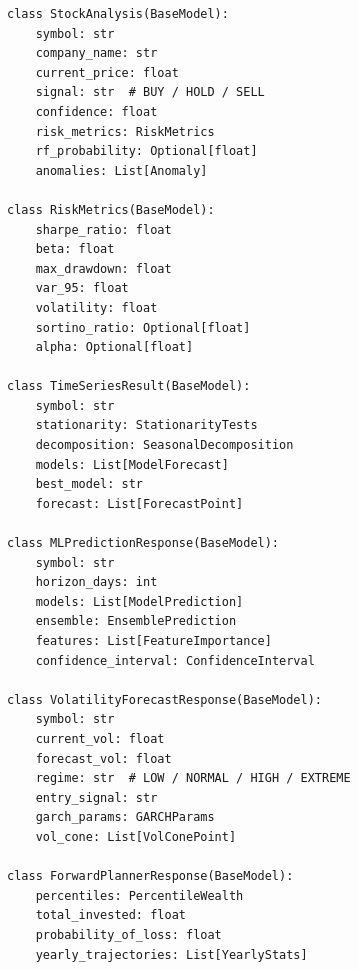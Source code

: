 \documentclass[12pt, a4paper, oneside]{report}
\begin{document}
\begin{appendices}
\begin{lstlisting}[style=pythonstyle, caption={Key Pydantic response schemas}, label={lst:pydantic_schemas}]
class StockAnalysis(BaseModel):
    symbol: str
    company_name: str
    current_price: float
    signal: str  # BUY / HOLD / SELL
    confidence: float
    risk_metrics: RiskMetrics
    rf_probability: Optional[float]
    anomalies: List[Anomaly]

class RiskMetrics(BaseModel):
    sharpe_ratio: float
    beta: float
    max_drawdown: float
    var_95: float
    volatility: float
    sortino_ratio: Optional[float]
    alpha: Optional[float]

class TimeSeriesResult(BaseModel):
    symbol: str
    stationarity: StationarityTests
    decomposition: SeasonalDecomposition
    models: List[ModelForecast]
    best_model: str
    forecast: List[ForecastPoint]

class MLPredictionResponse(BaseModel):
    symbol: str
    horizon_days: int
    models: List[ModelPrediction]
    ensemble: EnsemblePrediction
    features: List[FeatureImportance]
    confidence_interval: ConfidenceInterval

class VolatilityForecastResponse(BaseModel):
    symbol: str
    current_vol: float
    forecast_vol: float
    regime: str  # LOW / NORMAL / HIGH / EXTREME
    entry_signal: str
    garch_params: GARCHParams
    vol_cone: List[VolConePoint]

class ForwardPlannerResponse(BaseModel):
    percentiles: PercentileWealth
    total_invested: float
    probability_of_loss: float
    yearly_trajectories: List[YearlyStats]
\end{lstlisting}

\end{appendices}
\end{document}

